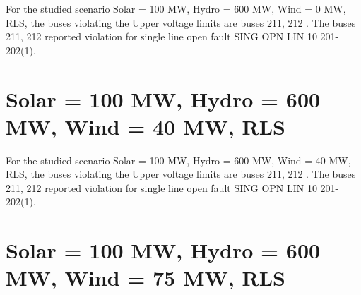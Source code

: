 \documentclass[10pt]{report}
\begin{document}
For the studied scenario Solar = 100 MW, Hydro = 600 MW, Wind = 0 MW, RLS, the buses violating the Upper voltage limits are buses 211, 212 .
The buses 211, 212 reported violation for single line open fault SING OPN LIN   10 201-202(1).
\begin{table}[H]
\caption{Contingencies reporting bus voltages greater than emergency voltage of 1.1 PU for scenario Solar = 100 MW, Hydro = 600 MW, Wind = 0 MW, RLS}
\label{HVSolar100MWHydro600MWWind0MWRLS}
\centering
{}
\end{table}

\section{Solar = 100 MW, Hydro = 600 MW, Wind = 40 MW, RLS}

For the studied scenario Solar = 100 MW, Hydro = 600 MW, Wind = 40 MW, RLS, the buses violating the Upper voltage limits are buses 211, 212 .
The buses 211, 212 reported violation for single line open fault SING OPN LIN   10 201-202(1).
\begin{table}[H]
\caption{Contingencies reporting bus voltages greater than emergency voltage of 1.1 PU for scenario Solar = 100 MW, Hydro = 600 MW, Wind = 40 MW, RLS}
\label{HVSolar100MWHydro600MWWind40MWRLS}
\centering
{}
\end{table}

\section{Solar = 100 MW, Hydro = 600 MW, Wind = 75 MW, RLS}
\end{document}
